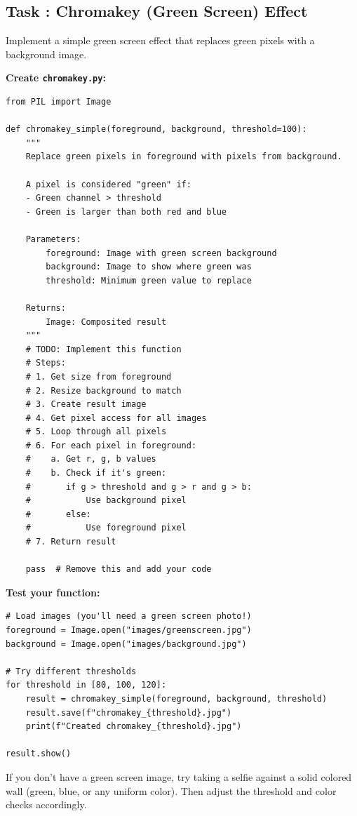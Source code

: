 \documentclass[11pt]{article}
\newcounter{taskcounter}
\newcommand{\task}[1]{%
    \stepcounter{taskcounter}%
    \subsection*{Task \thetaskcounter: #1}%
}
\begin{document}
\task{Chromakey (Green Screen) Effect}

Implement a simple green screen effect that replaces green pixels with a background image.

\textbf{Create \texttt{chromakey.py}:}

\begin{lstlisting}
from PIL import Image

def chromakey_simple(foreground, background, threshold=100):
    """
    Replace green pixels in foreground with pixels from background.

    A pixel is considered "green" if:
    - Green channel > threshold
    - Green is larger than both red and blue

    Parameters:
        foreground: Image with green screen background
        background: Image to show where green was
        threshold: Minimum green value to replace

    Returns:
        Image: Composited result
    """
    # TODO: Implement this function
    # Steps:
    # 1. Get size from foreground
    # 2. Resize background to match
    # 3. Create result image
    # 4. Get pixel access for all images
    # 5. Loop through all pixels
    # 6. For each pixel in foreground:
    #    a. Get r, g, b values
    #    b. Check if it's green:
    #       if g > threshold and g > r and g > b:
    #           Use background pixel
    #       else:
    #           Use foreground pixel
    # 7. Return result

    pass  # Remove this and add your code
\end{lstlisting}

\textbf{Test your function:}

\begin{lstlisting}
# Load images (you'll need a green screen photo!)
foreground = Image.open("images/greenscreen.jpg")
background = Image.open("images/background.jpg")

# Try different thresholds
for threshold in [80, 100, 120]:
    result = chromakey_simple(foreground, background, threshold)
    result.save(f"chromakey_{threshold}.jpg")
    print(f"Created chromakey_{threshold}.jpg")

result.show()
\end{lstlisting}

\begin{note}
If you don't have a green screen image, try taking a selfie against a solid colored wall (green, blue, or any uniform color). Then adjust the threshold and color checks accordingly.
\end{note}
\end{document}
